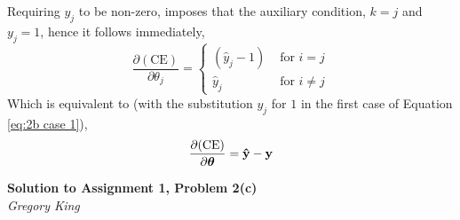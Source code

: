 \documentclass[letter,12pt]{article}
\newcommand{\myhwtitle}[3]
{\begin{center}
{\large {\bf Solution to Assignment {#1}, Problem {#2}}}\\
\medskip
{\it {#3}} %
\end{center}}
\newcommand{\solutionsAuthor}{Gregory King}
\begin{document}
Requiring $y_{j}$ to be non-zero, imposes that the auxiliary condition, $k=j$ and $y_{j}=1$, hence it follows immediately,
\begin{equation}
\frac{\partial(\textrm{CE})}{\partial{\theta_{j}}} = \begin{cases}
(\hat{y}_{j} - 1)&\text{ for }i=j\label{eq:2b case 1} \\
\hat{y}_{j}&\text{ for }i\neq j
\end{cases}
\end{equation}
Which is equivalent to (with the substitution $y_{j}$ for $1$ in the first case of Equation \ref{eq:2b case 1}),
\begin{equation}
\frac{\partial(\textrm{CE})}{\partial{\boldsymbol\theta}} = \bf{\hat{y}} - \bf{y}
\end{equation}

\clearpage

\myhwtitle{1}{2(c)}{\solutionsAuthor}
\bigskip
\end{document}
